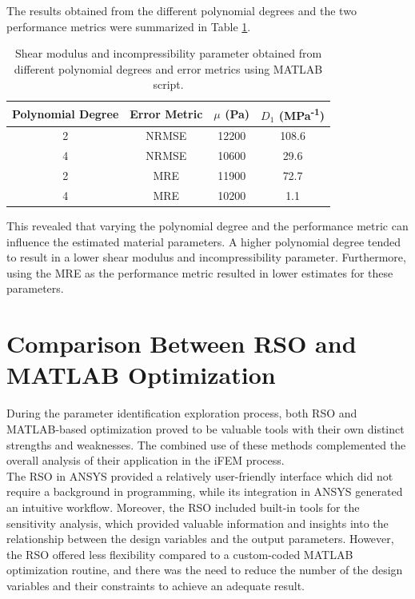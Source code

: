 The results obtained from the different polynomial degrees and the two performance metrics were summarized
in Table \ref{tab:materialsetMATLAB}.
\begin{table}[h!]
	\centering
	\begin{tabular}{|c|c|c|c|}
	\hline
	\textbf{Polynomial Degree} & \textbf{Error Metric} & $\mu$ (Pa) &	$D_1$ (MPa\textsuperscript{-1}) \\
	\hline
	2 & NRMSE & 12200 & 108.6 \\
	4 & NRMSE & 10600 & 29.6 \\
	2 & MRE & 11900 & 72.7 \\
	4 & MRE & 10200 & 1.1 \\
	\hline
	\end{tabular}
	\caption[Material parameter sets obtained from MATLAB]{Shear modulus and incompressibility parameter obtained from different polynomial degrees and error metrics using MATLAB script.}
	\label{tab:materialsetMATLAB}
\end{table}

This revealed that varying the polynomial degree and the performance metric can influence the estimated material parameters. 
A higher polynomial degree tended to result in a lower shear modulus and incompressibility parameter. Furthermore, 
using the MRE as the performance metric resulted in lower estimates for these parameters.\\

\section{Comparison Between RSO and MATLAB Optimization}
\label{section:comparisonrsomatlab}

During the parameter identification exploration process, both RSO and MATLAB-based optimization proved to be valuable tools with 
their own distinct strengths and weaknesses. The combined use of these methods complemented the overall analysis of their application in the
iFEM process.\\

The RSO in ANSYS provided a relatively user-friendly interface which did not require a background in programming, while its integration
in ANSYS generated an intuitive workflow. Moreover, the RSO included built-in tools for the sensitivity analysis, which provided 
valuable information and insights into the relationship between the design variables and the output parameters. 
However, the RSO offered less flexibility compared to a custom-coded MATLAB optimization routine, and there was the need to 
reduce the number of the design variables and their constraints to achieve an adequate result.\\


